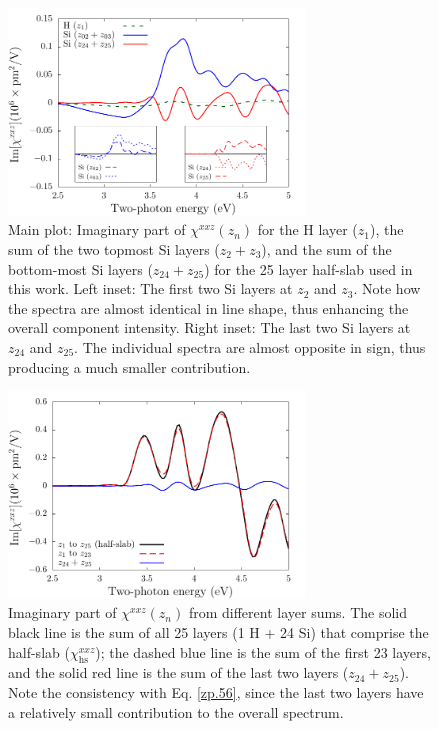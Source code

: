 \documentclass[utf8]{frontiersSCNS}
\begin{document}
\begin{figure}[b]
\centering 
\includegraphics[width=0.7\textwidth]{figures/fig2}
\caption{Main plot: Imaginary part of $\chi^{xxz}(z_{n})$ for the H layer
($z_1$), the sum of the two topmost Si layers ($z_{2} + z_{3}$), and the sum of
the bottom-most Si layers ($z_{24 }+ z_{25}$) for the 25 layer half-slab used in
this work. Left inset: The first two Si layers at $z_{2}$ and $z_{3}$. Note how
the spectra are almost identical in line shape, thus enhancing the overall
component intensity. Right inset: The last two Si layers at $z_{24}$ and
$z_{25}$. The individual spectra are almost opposite in sign, thus producing a
much smaller contribution.}
\label{fig:layers}
\end{figure}

\begin{figure}[b]
\centering 
\includegraphics[width=0.7\textwidth]{figures/fig3}
\caption{
Imaginary part of $\chi^{xxz}(z_{n})$ from different layer sums. The
solid black line is the sum of all 25 layers (1 H + 24 Si) that comprise the
half-slab ($\chi^{xxz}_{\mathrm{hs}}$); the dashed blue line is the sum of the
first 23 layers, and the solid red line is the sum of the last two layers
($z_{24 }+ z_{25}$). Note the consistency with Eq. \eqref{zp.56}, since the
last two layers have a relatively small contribution to the overall spectrum.}
\label{fig:sums}
\end{figure}
\end{document}
